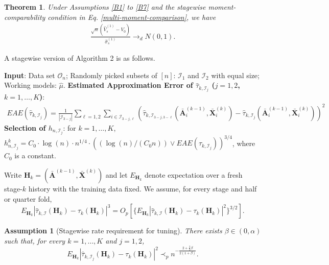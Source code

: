 \documentclass[11pt]{article}
\theoremstyle{referenceplain}
\newtheorem{theorem}{Theorem}
\newtheorem{assumption}{Assumption}
\theoremstyle{referencedefinition}
\theoremstyle{referenceremark}
\begin{document}
 \begin{theorem}\label{thmb1}
     Under Assumptions \ref{B1} to \ref{B7} and the stagewise moment-comparability condition in Eq. \eqref{multi-moment-comparison}, we have
     \begin{align*}
         \frac{\sqrt{n}(\widehat{V}_{s}^{(1)}-V_0)}{\widehat{\sigma}_{s}^{(1)}}\to_d N(0,1).
     \end{align*}
 \end{theorem}
 A stagewise version of Algorithm 2 is as follows.
\begin{algorithm}[H]
\caption{Selection of $h_n$ in multiple time point case}
    \begin{algorithmic}[1]
        \State \textbf{Input}: Data set $\mathcal{O}_n$; Randomly picked subsets of $[n]$: $\mathcal{I}_1$ and $\mathcal{I}_2$ with equal size; Working models: $\widehat{\mu}$.
        \State \textbf{Estimated Approximation Error of $\widehat{\tau}_{k,\mathcal{I}_j}$ ($j=1,2$, $k=1,\ldots,K$)}:
 \begin{align*}
     EAE(\widehat{\tau}_{k,\mathcal{I}_j})=\frac{1}{|\mathcal{I}_{3-j}|}\sum_{\ell=1,2}\sum_{i\in\mathcal{I}_{3-j,\ell}}\left(\widehat{\tau}_{k,\mathcal{I}_{3-j,3-\ell}}(\bar{\mathbf{A}}_i^{(k-1)},\bar{\mathbf{X}}_i^{(k)})- \widehat{\tau}_{k,\mathcal{I}_{j}}(\bar{\mathbf{A}}_i^{(k-1)},\bar{\mathbf{X}}_i^{(k)})\right)^2
 \end{align*}
 \State \textbf{Selection of $h_{n,\mathcal{I}_j}$}: for $k=1,\dots,K$,  $h_{n,\mathcal{I}_j}^{k}={C_0}\cdot \log(n)\cdot n^{1/4}\cdot((\log(n)/({C_0} n))\lor EAE(\widehat{\tau}_{k,\mathcal{I}_j}))^{3/4}$, where ${C_0}$ is a constant.
    \end{algorithmic}
\label{alg5}
\end{algorithm}
Write $\mathbf H_k=(\bar{\mathbf A}^{(k-1)},\bar{\mathbf X}^{(k)})$ and let $E_{\mathbf H_k}$ denote expectation over a fresh stage-$k$ history with the training data fixed. We assume, for every stage and half or quarter fold,
\begin{equation}\label{multi-moment-comparison}
E_{\mathbf H_k}|\widehat\tau_{k,\mathcal I}(\mathbf H_k)-\tau_k(\mathbf H_k)|^3
=O_p\left[\{E_{\mathbf H_k}|\widehat\tau_{k,\mathcal I}(\mathbf H_k)-\tau_k(\mathbf H_k)|^2\}^{3/2}\right].
\end{equation}
\begin{assumption}[Stagewise rate requirement for tuning]\label{B8}
There exists $\beta\in(0,\alpha)$ such that, for every $k=1,\ldots,K$ and $j=1,2$,
\[
E_{\mathbf H_k}|\widehat\tau_{k,\mathcal I_j}(\mathbf H_k)-\tau_k(\mathbf H_k)|^2
\prec_p n^{-\frac{2+\frac{2}{3}\beta}{2(1+\beta)}}.
\]
\end{assumption}
\end{document}
